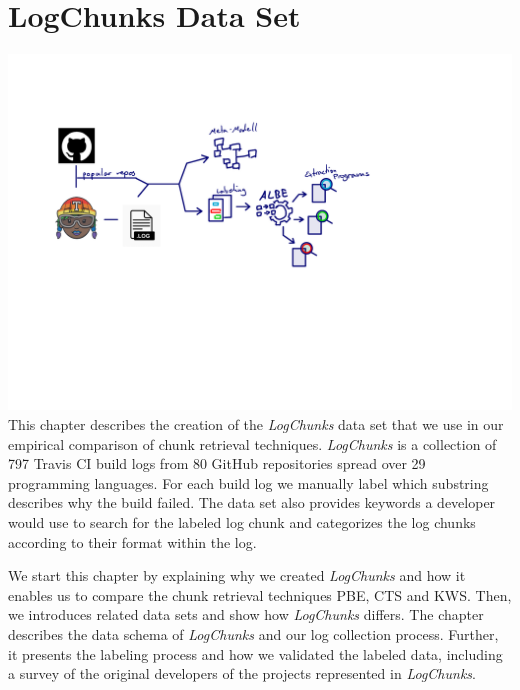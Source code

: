 \documentclass[\myrootdir/main.tex]{subfiles}
\begin{document}
\chapter{LogChunks Data Set}
\label{sec:data-set}
\includegraphics[page=5, width=\textwidth, trim={0.5cm 0.5cm 0.5cm 0.5cm}, clip]{img/flow-of-research.pdf}
This chapter describes the creation of the \emph{LogChunks} data set that we use in our empirical comparison of chunk retrieval techniques.
\emph{LogChunks} is a collection of 797 Travis CI build logs from 80 GitHub repositories spread over 29 programming languages.
For each build log we manually label which substring describes why the build failed.
The data set also provides keywords a developer would use to search for the labeled log chunk and categorizes the log chunks according to their format within the log.

We start this chapter by explaining why we created \emph{LogChunks} and how it enables us to compare the chunk retrieval techniques PBE, CTS and KWS\@.
Then, we introduces related data sets and show how \emph{LogChunks} differs.
The chapter describes the data schema of \emph{LogChunks} and our log collection process.
Further, it presents the labeling process and how we validated the labeled data, including a survey of the original developers of the projects represented in \emph{LogChunks}.
\end{document}
